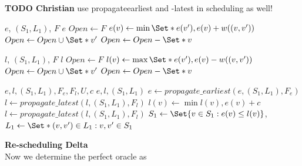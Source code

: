 \documentclass{article}
\begin{document}
\begin{mdframed}
{\bf TODO Christian} use propagateearliest and -latest in scheduling as well!
\end{mdframed}

\begin{algorithm}
	\caption{$propagate\_earliest$} \label{algo:propagate_earliest}
	\begin{algorithmic}[1]
	    \Require $e$, $(S_1,L_1)$, $F$
	    \Ensure $e$
	    \State $Open \leftarrow F$
    			\State $e(v) \leftarrow \min \Set*{e(v^\prime), e(v)+w((v,v^\prime))}$
    			\State $Open \leftarrow Open \cup \Set*{v^\prime}$
    		\EndFor
			\State $Open \leftarrow Open - \Set*{v}$
		\EndFor
	\end{algorithmic}
\end{algorithm}



\begin{algorithm}
	\caption{$propagate\_latest$} \label{algo:propagate_latest}
	\begin{algorithmic}[1]
	    \Require $l$, $(S_1,L_1)$, $F$
	    \Ensure $l$
	    \State $Open \leftarrow F$
    			\State $l(v) \leftarrow \max \Set*{e(v^\prime), e(v)-w((v,v^\prime))}$
    			\State $Open \leftarrow Open \cup \Set*{v^\prime}$
    		\EndFor
			\State $Open \leftarrow Open - \Set*{v}$
		\EndFor
	\end{algorithmic}
\end{algorithm}


\begin{algorithm}
	\caption{$propagate$} \label{algo:propagate}
	\begin{algorithmic}[1]
	    \Require $e,l,(S_1,L_1),F_e,F_l,U,c$
	    \Ensure $e,l,(S_1,L_1)$
	    \State $e \leftarrow propagate\_earliest(e, (S_1,L_1), F_e)$
		\State $l \leftarrow propagate\_latest(l,(S_1,L_1),F_l)$
	        \State $l(v) \leftarrow \min l(v), e(v)+c$
	    \EndFor
		\State $l \leftarrow propagate\_latest(l,(S_1,L_1),F_l)$
		\State $S_1 \leftarrow \Set{v \in S_1: e(v) \leq l(v)}$, $L_1 \leftarrow \Set*{(v,v^\prime) \in L_1: v,v^\prime \in S_1}$
	\end{algorithmic}
\end{algorithm}



\textbf{Re-scheduling Delta}
\\
Now we determine the perfect oracle  as
\end{document}
